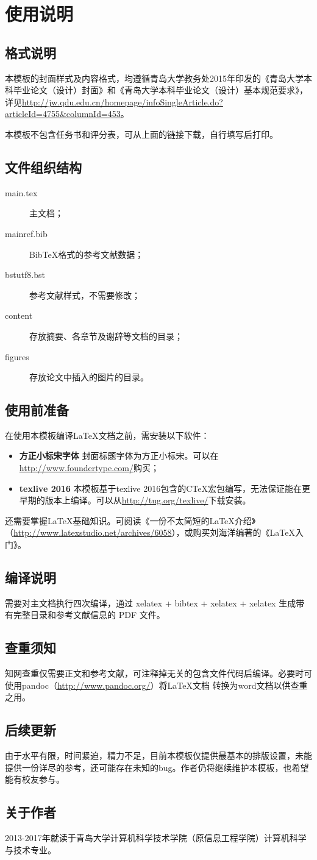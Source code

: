 \chapter{使用说明}
\section{格式说明}
本模板的封面样式及内容格式，均遵循青岛大学教务处2015年印发的《青岛大学本科毕业论文（设计）封面》和《青岛大学本科毕业论文（设计）基本规范要求》，详见\url{http://jw.qdu.edu.cn/homepage/infoSingleArticle.do?articleId=4755&columnId=453}。

本模板不包含任务书和评分表，可从上面的链接下载，自行填写后打印。

\section{文件组织结构}
\begin{description}
\item[main.tex] 主文档；
\item[mainref.bib] BibTeX格式的参考文献数据；
\item[bstutf8.bst] 参考文献样式，不需要修改；
\item[content] 存放摘要、各章节及谢辞等文档的目录；
\item[figures] 存放论文中插入的图片的目录。
\end{description}
\section{使用前准备}
在使用本模板编译\LaTeX 文档之前，需安装以下软件：
\begin{itemize}
\item{\bf 方正小标宋字体} 封面标题字体为方正小标宋。可以在\url{http://www.foundertype.com/}购买；
\item{\bf texlive 2016} 本模板基于texlive 2016包含的CTeX宏包编写，无法保证能在更早期的版本上编译。可以从\url{http://tug.org/texlive/}下载安装。
\end{itemize}

还需要掌握\LaTeX 基础知识。可阅读《一份不太简短的\LaTeX 介绍》（\url{http://www.latexstudio.net/archives/6058}），或购买刘海洋编著的《\LaTeX 入门》。

\section{编译说明}
需要对主文档执行四次编译，通过 xelatex + bibtex + xelatex + xelatex 生成带有完整目录和参考文献信息的 PDF 文件。

\section{查重须知}
知网查重仅需要正文和参考文献，可注释掉无关的包含文件代码后编译。必要时可使用pandoc（\url{http://www.pandoc.org/}）将\LaTeX 文档 转换为word文档以供查重之用。

\section{后续更新}
由于水平有限，时间紧迫，精力不足，目前本模板仅提供最基本的排版设置，未能提供一份详尽的参考，还可能存在未知的bug。作者仍将继续维护本模板，也希望能有校友参与。

\section{关于作者}
2013-2017年就读于青岛大学计算机科学技术学院（原信息工程学院）计算机科学与技术专业。
